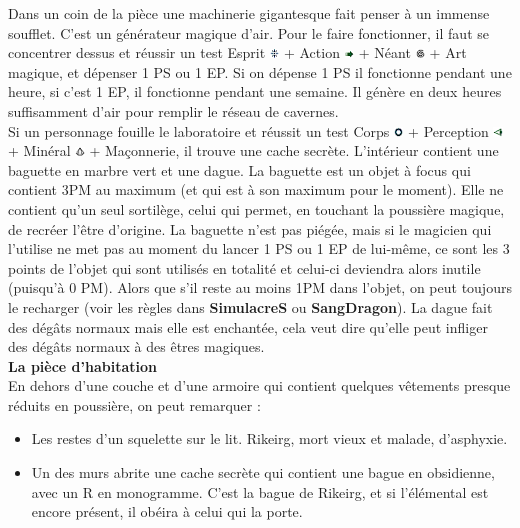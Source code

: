 \documentclass[11pt,twoside,a4paper]{article}
\def\imgCORPS{\includegraphics[width=0.25cm]{../../../../../imgGraphics/rolePlayingGame/SimulacreS/mini12x12/corps.png} }
\def\imgESPRI{\includegraphics[width=0.25cm]{../../../../../imgGraphics/rolePlayingGame/SimulacreS/mini12x12/esprit.png} }
\def\imgPERCE{\includegraphics[width=0.25cm]{../../../../../imgGraphics/rolePlayingGame/SimulacreS/mini12x12/perception.png} }
\def\imgACTIO{\includegraphics[width=0.25cm]{../../../../../imgGraphics/rolePlayingGame/SimulacreS/mini12x12/action.png} }
\def\imgMINER{\includegraphics[width=0.25cm]{../../../../../imgGraphics/rolePlayingGame/SimulacreS/mini12x12/mineral.png} }
\def\imgNEANT{\includegraphics[width=0.25cm]{../../../../../imgGraphics/rolePlayingGame/SimulacreS/mini12x12/neant.png} }
\begin{document}
\begin{multicols}{3}
{Dans un coin de la pi{\`e}ce une machinerie gigantesque fait penser {\`a} un immense soufflet. C'est un g{\'e}n{\'e}rateur magique d'air. Pour le faire fonctionner, il faut se concentrer dessus et r{\'e}ussir un test Esprit \imgESPRI + Action \imgACTIO + N{\'e}ant \imgNEANT + Art magique, et d{\'e}penser 1 PS ou 1 EP. Si on d{\'e}pense 1 PS il fonctionne pendant une heure, si c'est 1 EP, il fonctionne pendant une semaine. Il g{\'e}n{\`e}re en deux heures suffisamment d'air pour remplir le r{\'e}seau de cavernes.~\\

Si un personnage fouille le laboratoire et r{\'e}ussit un test Corps \imgCORPS + Perception \imgPERCE + Min{\'e}ral \imgMINER + Ma\c{c}onnerie, il trouve une cache secr{\`e}te. L'int{\'e}rieur contient une baguette en marbre vert et une dague. La baguette est un objet {\`a} focus qui contient 3PM au maximum (et qui est {\`a} son maximum pour le moment). Elle ne contient qu'un seul sortil{\`e}ge, celui qui permet, en touchant la poussi{\`e}re magique, de recr{\'e}er l'{\^e}tre d'origine. La baguette n'est pas pi{\'e}g{\'e}e, mais si le magicien qui l'utilise ne met pas au moment du lancer 1 PS ou 1 EP de lui-m{\^e}me, ce sont les 3 points de l'objet qui sont utilis{\'e}s en totalit{\'e} et celui-ci deviendra alors inutile (puisqu'{\`a} 0 PM). Alors que s'il reste au moins 1PM dans l'objet, on peut toujours le recharger (voir les r{\`e}gles dans \textbf{SimulacreS} ou \textbf{SangDragon}). La dague fait des d{\'e}g{\^a}ts normaux mais elle est enchant{\'e}e, cela veut dire qu'elle peut infliger des d{\'e}g{\^a}ts normaux {\`a} des {\^e}tres magiques.~\\

\textbf{La pi{\`e}ce d'habitation}~\\

En dehors d'une couche et d'une armoire qui contient quelques v{\^e}tements presque r{\'e}duits en poussi{\`e}re, on peut remarquer :
\setlength\parindent{20pt}
\begin{itemize}
		\item Les restes d'un squelette sur le lit. Rikeirg, mort vieux et malade, d'asphyxie.
		\item Un des murs abrite une cache secr{\`e}te qui contient une bague en obsidienne, avec un R en monogramme. C'est la bague de Rikeirg, et si l'{\'e}l{\'e}mental est encore pr{\'e}sent, il ob{\'e}ira {\`a} celui qui la porte.
\end{itemize}~\\
\setlength\parindent{0pt}

}
\end{multicols}
\end{document}
